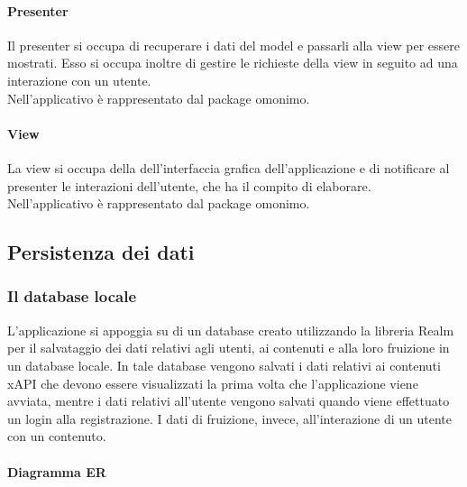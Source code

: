 \documentclass[../Tesi.tex]{subfiles}
\begin{document}
		\paragraph*{Presenter}
		Il presenter si occupa di recuperare i dati del model e passarli alla view per essere mostrati. Esso si occupa inoltre di gestire le richieste della view in seguito ad una interazione con un utente. \\ Nell'applicativo è rappresentato dal package omonimo.

		\paragraph*{View}
		La view si occupa della dell'interfaccia grafica dell'applicazione e di notificare al presenter le interazioni dell'utente, che ha il compito di elaborare. \\ Nell'applicativo è rappresentato dal package omonimo.
	
	\subsection{Persistenza dei dati}
		\subsubsection{Il database locale}
		L'applicazione si appoggia su di un database creato utilizzando la libreria Realm per il salvataggio dei dati relativi agli utenti, ai contenuti e alla loro fruizione in un database locale. In tale database vengono salvati i dati relativi ai contenuti xAPI che devono essere visualizzati la prima volta che l'applicazione viene avviata, mentre i dati relativi all'utente vengono salvati quando viene effettuato un login alla registrazione. I dati di fruizione, invece, all'interazione di un utente con un contenuto.
			
			\paragraph{Diagramma ER}
\end{document}
